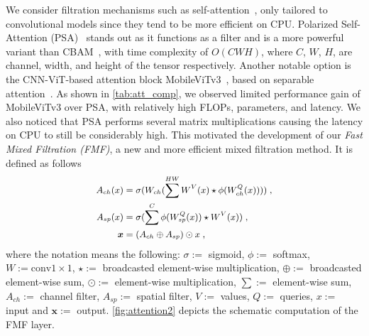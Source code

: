 We consider filtration mechanisms such as self-attention~\cite{vaswani2017attention}, only tailored to convolutional models since they tend to be more efficient on CPU. Polarized Self-Attention (PSA)~\cite{liu2021polarized} stands out as it functions as a filter and is a more powerful variant than CBAM~\cite{woo2018cbam}, with time complexity of $O(CWH)$, where $C$, $W$, $H$, are channel, width, and height of the tensor respectively. Another notable option is the CNN-ViT-based attention block MobileViTv3~\cite{wadekar2022mobilevitv3}, based on separable attention~\cite{mehta2022separable}. As shown in \ref{tab:att_comp}, we observed limited performance gain of MobileViTv3 over PSA, with relatively high FLOPs, parameters, and latency. We also noticed that PSA performs several matrix multiplications causing the latency on CPU to still be considerably high. This motivated the development of our \emph{Fast Mixed Filtration (FMF)}, a new and more efficient mixed filtration method. It is defined as follows
\begin{equation}\small
  \centering
  \label{eq:fast_pol_attention}
      \begin{aligned}   
          A_{ch}(x) &= \sigma(W_{ch}(\sum^{HW} W^V(x) \star \phi(W^Q_{ch}(x))  )) \; , \\ %
          A_{sp}(x) &= \sigma(\sum^{C} \phi(W^Q_{sp}(x)) \star W^V(x))\; ,\\ %
          \boldsymbol{x} &= (A_{ch} \oplus  A_{sp}) \odot x \; , \\
\end{aligned}
\end{equation}
where the notation means the following: $\sigma :=$ sigmoid, $\phi :=$ softmax, $W := \mathrm{conv}1 \times 1$,  $\star :=$ broadcasted element-wise multiplication, $\oplus :=$ broadcasted element-wise sum, $\odot :=$ element-wise multiplication, $\sum :=$ element-wise sum, $A_{ch} :=$ channel filter, $A_{sp} :=$ spatial filter, $V:=$ values, $Q:=$ queries, $x :=$ input  and $\boldsymbol{x} :=$ output. \ref{fig:attention2} depicts the schematic computation of the FMF layer.\\

